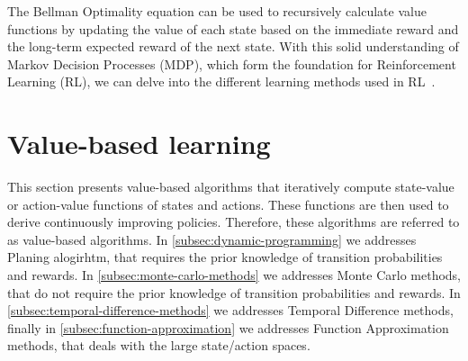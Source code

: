 \documentclass[../xlapes02]{subfiles}
\begin{document}
    The Bellman Optimality equation can be used to recursively calculate value functions by updating the value of each state based on the immediate reward and the long-term expected reward of the next state. With this solid understanding of Markov Decision Processes (MDP), which form the foundation for Reinforcement Learning (RL), we can delve into the different learning methods used in RL~\cite{sutton2018reinforcement}.


    \section{Value-based learning}\label{sec:value-based-learning}
    This section presents value-based algorithms that iteratively compute state-value or action-value functions of states and actions. These functions are then used to derive continuously improving policies. Therefore, these algorithms are referred to as value-based algorithms. In \cref{subsec:dynamic-programming} we addresses Planing alogirhtm, that requires the prior knowledge of transition probabilities and rewards. In \cref{subsec:monte-carlo-methods} we addresses Monte Carlo methods, that do not require the prior knowledge of transition probabilities and rewards. In \cref{subsec:temporal-difference-methods} we addresses Temporal Difference methods, finally in \cref{subsec:function-approximation} we addresses Function Approximation methods, that deals with the large state/action spaces.

\end{document}
